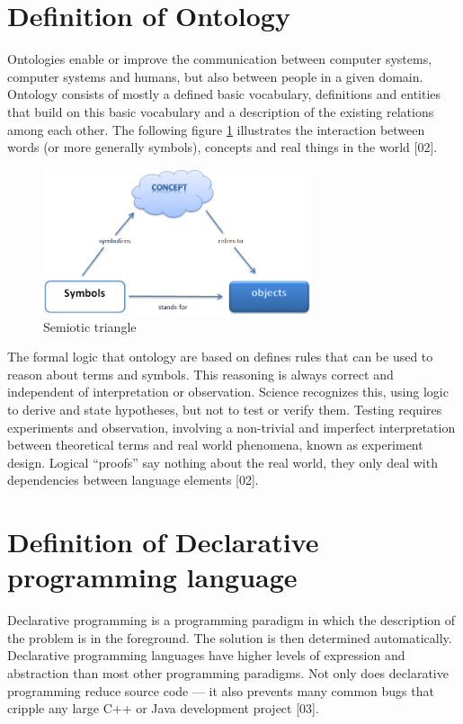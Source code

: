 \section{Definition of Ontology}\label{sec:app:ontology}
Ontologies enable or improve the communication between computer systems, computer systems and humans, but also between people in a given domain. Ontology consists of mostly a defined basic vocabulary, definitions and entities that build on this basic vocabulary and a description of the existing relations among each other. The following figure \ref{fig:semiotic_triangle} illustrates the interaction between words (or more generally symbols), concepts and real things in the world [02]. %
\begin{figure}[h]
	\centering
	\includegraphics[width=0.7\textwidth]{pics/appendix/onto.png}
	\caption{Semiotic triangle \label{fig:semiotic_triangle}}	
\end{figure}
\par
The formal logic that ontology are based on defines rules that can be used to reason about terms and symbols. This reasoning is always correct and independent of interpretation or observation. Science recognizes this, using logic to derive and state hypotheses, but not to test or verify them. Testing requires experiments and observation, involving a non-trivial and imperfect interpretation between theoretical terms and real world phenomena, known as experiment design. Logical “proofs” say nothing about the real world, they only deal with dependencies between language elements [02]. %

\section{Definition of Declarative programming language}
\par
Declarative programming is a programming paradigm in which the description of the problem is in the foreground. The solution is then determined automatically. Declarative programming languages have higher levels of expression and abstraction than most other programming paradigms. Not only does declarative programming reduce source code — it also prevents many common bugs that cripple any large C++ or Java development project [03]. 

